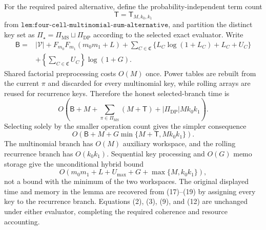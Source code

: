 For the required paired alternative, define the probability-independent term count
\[
\mathsf T=\mathsf T_{M,k_0,k_1}
\]
from \(\texttt{lem:four-cell-multinomial-sum-alternative}\), and partition the distinct key set as
\(\Pi_\star=\Pi_{\mathrm{MS}}\sqcup\Pi_{\mathrm{DP}}\) according to the selected exact evaluator.  Write
\[
\begin{aligned}
\mathsf B={}&|\mathcal V|+F_{m_0}F_{m_1}(m_0m_1+L)
+\sum_{C\in\mathfrak C}\{L_C\log(1+L_C)+L_C+U_C\}\\
&+\left\{\sum_{C\in\mathfrak C}U_C\right\}\log(1+G).
\end{aligned} \tag{16}
\]
Shared factorial preprocessing costs \(O(M)\) once.  Power tables are rebuilt from the current \(\pi\) and discarded for every multinomial key, while rolling arrays are reused for recurrence keys.  Therefore the honest selected-branch time is
\[
O\!\left(
\mathsf B+M+\sum_{\pi\in\Pi_{\mathrm{MS}}}(M+\mathsf T)
+|\Pi_{\mathrm{DP}}|Mk_0k_1
\right). \tag{17}
\]
Selecting solely by the smaller operation count gives the simpler consequence
\[
O\!\left(\mathsf B+M+G\min\{M+\mathsf T,Mk_0k_1\}\right). \tag{18}
\]
The multinomial branch has \(O(M)\) auxiliary workspace, and the rolling recurrence branch has \(O(k_0k_1)\).  Sequential key processing and \(O(G)\) memo storage give the unconditional hybrid bound
\[
O\!\left(m_0m_1+L+U_{\max}+G+\max\{M,k_0k_1\}\right), \tag{19}
\]
not a bound with the minimum of the two workspaces.  The original displayed time and memory in the lemma are recovered from (17)--(19) by assigning every key to the recurrence branch.  Equations (2), (3), (9), and (12) are unchanged under either evaluator, completing the required coherence and resource accounting.